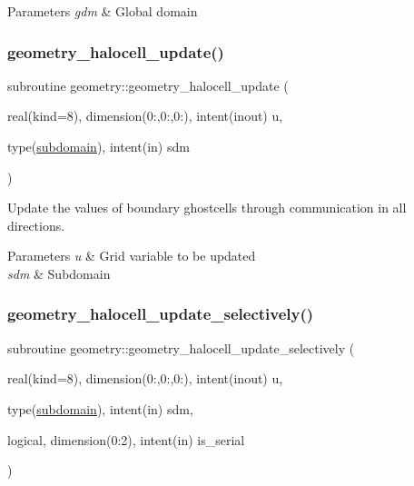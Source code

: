 \begin{DoxyParams}{Parameters}
{\em gdm} & Global domain \\
\hline
\end{DoxyParams}
\mbox{\label{namespacegeometry_a28c9704c14f29b1f57c491246b206991}} 
\subsubsection{\texorpdfstring{geometry\+\_\+halocell\+\_\+update()}{geometry\_halocell\_update()}}
{\footnotesize\ttfamily subroutine geometry\+::geometry\+\_\+halocell\+\_\+update (\begin{DoxyParamCaption}\item[{real(kind=8), dimension(0\+:,0\+:,0\+:), intent(inout)}]{u,  }\item[{type(\hyperlink{structgeometry_1_1subdomain}{subdomain}), intent(in)}]{sdm }\end{DoxyParamCaption})}



Update the values of boundary ghostcells through communication in all directions. 


\begin{DoxyParams}{Parameters}
{\em u} & Grid variable to be updated \\
\hline
{\em sdm} & Subdomain \\
\hline
\end{DoxyParams}
\mbox{\label{namespacegeometry_a13a9857b633f18041d764401c91d2918}} 
\subsubsection{\texorpdfstring{geometry\+\_\+halocell\+\_\+update\+\_\+selectively()}{geometry\_halocell\_update\_selectively()}}
{\footnotesize\ttfamily subroutine geometry\+::geometry\+\_\+halocell\+\_\+update\+\_\+selectively (\begin{DoxyParamCaption}\item[{real(kind=8), dimension(0\+:,0\+:,0\+:), intent(inout)}]{u,  }\item[{type(\hyperlink{structgeometry_1_1subdomain}{subdomain}), intent(in)}]{sdm,  }\item[{logical, dimension(0\+:2), intent(in)}]{is\+\_\+serial }\end{DoxyParamCaption})}



